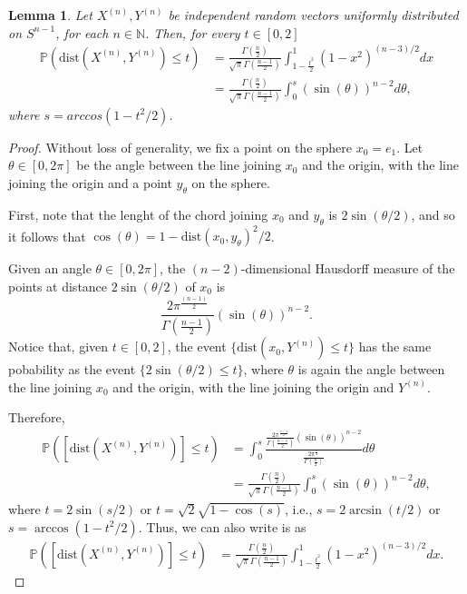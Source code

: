 \documentclass[10pt]{amsart}
\newtheorem{lemma}{Lemma}[section]
\newcounter{theor}
\def\N{\mathbb{N}}
\def\dist{\text{dist}}
\numberwithin{equation}{section}
\begin{document}
\begin{lemma}
\label{lem:DistribDistSphere}
Let $X^{(n)},Y^{(n)}$ be independent random vectors uniformly distributed on $S^{n-1}$, for each $n \in \N$. Then, for every $t \in [0,2]$
\begin{align*}
\mathbb{P} (\dist(X^{(n)},Y^{(n)}) \leq t) & = \frac{\Gamma ( \frac{n}{2} ) }{ \sqrt{\pi} \Gamma ( \frac{n-1}{2} )} \int_{1-\frac{t^2}{2}}^{1} (1- x^2)^{(n-3)/2} dx 
 \\
  & = \frac{\Gamma ( \frac{n}{2} ) }{ \sqrt{\pi} \Gamma ( \frac{n-1}{2} )} \int_0^{s}  (\sin (\theta))^{n-2} d\theta ,
\end{align*}
where $s = arc cos (1-t^2/2)$.
\end{lemma}
\begin{proof}

Without loss of generality, we fix a point on the sphere $x_0 = e_1$. Let $\theta \in [0,2\pi ]$ be the angle between the line joining $x_0$ and the origin, with the line joining the origin and a point $y_\theta$ on the sphere.

First, note that the lenght of the chord joining $x_0$ and $y_\theta$ is $2 \sin (\theta / 2)$, and so it follows that $\cos( \theta) = 1- \dist(x_0 , y _\theta)^2 / 2 $.

Given an angle $\theta \in [0, 2\pi ]$, the $(n-2)$-dimensional Hausdorff measure of the points at distance $2 \sin (\theta / 2)$ of $x_0$ is
$$
\frac{2 \pi^{\frac{(n-1)}{2}}}{\Gamma ( \frac{n-1}{2} )} (\sin (\theta))^{n-2} .
$$
Notice that, given $t \in [0,2]$, the event $\lbrace \dist (x_0,Y^{(n)}) \leq t \rbrace$ has the same pobability as the event $\lbrace 2\sin ( \theta / 2 ) \leq t \rbrace$, where $\theta$ is again the angle between the line joining $x_0$ and the origin, with the line joining the origin and $Y^{(n)}$.

Therefore,
\begin{align*}
\mathbb{P} ([\dist(X^{(n)},Y^{(n)})] \leq t) & = \int_0^{s} \frac{\frac{2 \pi^{\frac{n-1}{2}}}{\Gamma ( \frac{n-1}{2} )} (\sin (\theta))^{n-2}}{\frac{2 \pi^{\frac{n}{2}}}{\Gamma ( \frac{n}{2} )}} d\theta 
 \\
 & = \frac{\Gamma ( \frac{n}{2} ) }{ \sqrt{\pi} \Gamma ( \frac{n-1}{2} )} \int_0^{s}  (\sin (\theta))^{n-2} d\theta ,
\end{align*}
where $t = 2 \sin (s / 2)$ or $t = \sqrt{2} \sqrt{1- \cos (s)}$, i.e., $s = 2 \arcsin (t / 2)$ or $s = \arccos (1-t^2/2)$. Thus, we can also write is as
\begin{align*}
\mathbb{P} ([\dist(X^{(n)},Y^{(n)})] \leq t) & = \frac{\Gamma ( \frac{n}{2} ) }{ \sqrt{\pi} \Gamma ( \frac{n-1}{2} )} \int_{1-\frac{t^2}{2}}^{1} (1- x^2)^{(n-3)/2} dx.
\end{align*}
\end{proof}
\end{document}
